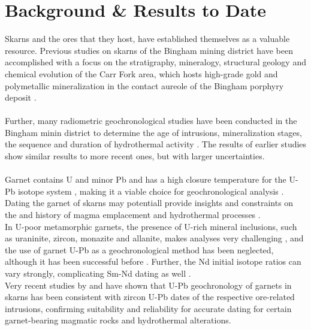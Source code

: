 \documentclass[a4paper,11pt,titlepage]{article}
\begin{document}
\section{Background \& Results to Date}

Skarns and the ores that they host, have established themselves as a valuable resource. Previous studies on skarns of the Bingham mining district have been accomplished with a focus on the stratigraphy, mineralogy, structural geology and chemical evolution of the Carr Fork area, which hosts high-grade gold and polymetallic mineralization in the contact aureole of the Bingham porphyry deposit \citep{Hunt1924, Lindgren1924, Winchell1924, Hansen1961, Atkinson1978a,Reid1978,Starkins1983,Cameron1987,Schloeglova2018}. 
\\
\\ Further, many radiometric geochronological studies have been conducted in the Bingham minin district to determine the age of intrusions, mineralization stages, the sequence and duration of hydrothermal activity \citep{Armstrong1970,Chesley1997,Deino1997,Kendrick2001b,Moore1973,Moore1971,Moore1968,Parry1997,Parry2001, Warnaars1978,Martinek2009}. The results of earlier studies show similar results to more recent ones, but with larger uncertainties.
\\
\\ Garnet contains U and minor Pb and has a high closure temperature for the U-Pb isotope system \citep{Mezger1989}, making it a viable choice for geochronological analysis \citep{Burton1992,Vance1993,Burton1995,Jung2003}. Dating the garnet of skarns may potentiall provide insights and constraints on the and history of magma emplacement and hydrothermal processes \citep{Heaman2001,Seman2017,Deng2017,Yang2018,Wafforn2018}.
\\ In U-poor metamorphic garnets, the presence of U-rich mineral inclusions, such as uraninite, zircon, monazite and allanite, makes analyses very challenging \citep{Dewolf1996,Vance1998,Lima2012}, and the use of garnet U-Pb as a geochronological method has been neglected, although it has been successful before \citep{Mezger1989}. Further, the Nd initial isotope ratios can vary strongly, complicating Sm-Nd dating as well \citep{Jamtveit1994}.
\\ Very recent studies by \citet{Deng2017} and \citet{Wafforn2018} have shown that U-Pb geochronology of garnets in skarns has been consistent with zircon U-Pb dates of the respective ore-related intrusions, confirming suitability and reliability for accurate dating for certain garnet-bearing magmatic rocks and hydrothermal alterations. 
\end{document}
